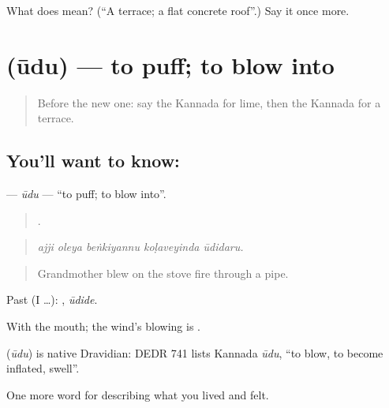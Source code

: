 \begin{tcolorbox}[breakable,colback=teal!4,colframe=teal!35!black,title={Before you move on}]
What does  mean? (\textquotedblleft{}A terrace; a flat concrete roof\textquotedblright{}.) Say it once more.
\end{tcolorbox}
\section[\texorpdfstring{\kn{ಊದು} (ūdu)}{ಊದು (ūdu)}]{ (ūdu) — to puff; to blow into}

\label{lesson:KA-C546-udu}



\begin{quote}
Before the new one: say the Kannada for lime, then the Kannada for a terrace.
\end{quote}

\subsection*{You'll want to know: }
\textbf{} — \emph{ūdu} — \textquotedblleft{}to puff; to blow into\textquotedblright{}.

\begin{quote}
    .
\end{quote}

\begin{quote}
\emph{ajji oleya beṅkiyannu koḷaveyinda ūdidaru.}
\end{quote}

\begin{quote}
Grandmother blew on the stove fire through a pipe.
\end{quote}

Past (I …): , \emph{ūdide}.

With the mouth; the wind's blowing is .

\begin{cousinweb}
\textbf{} (\emph{ūdu}) is native Dravidian: DEDR 741 lists Kannada \emph{ūdu}, \textquotedblleft{}to blow, to become inflated, swell\textquotedblright{}.
\end{cousinweb}

\begin{grammarlens}[title={What you've built}]
One more word for describing what you lived and felt.
\end{grammarlens}

